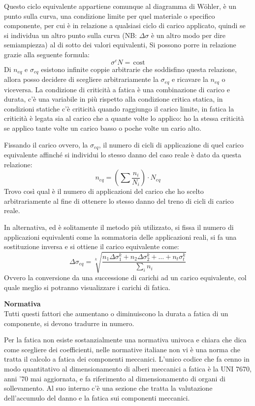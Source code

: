 \documentclass{article}
\begin{document}
\begin{adjustwidth}{2in}{}
				Questo ciclo equivalente appartiene comunque al diagramma di Wöhler, è un punto sulla curva, una condizione limite per quel materiale o specifico componente, per cui è in relazione a qualsiasi ciclo di carico applicato, quindi se si individua un altro punto sulla curva (NB: $\Delta\sigma$ è un altro modo per dire semiampiezza) al di sotto dei valori equivalenti, Si possono porre in relazione grazie alla seguente formula:
				\[\sigma^cN=\,\text{cost}\]				
				Di $n_{eq}$ e $\sigma_{eq}$ esistono infinite coppie arbitrarie che soddisfino questa relazione, allora posso decidere di scegliere arbitrariamente la $\sigma_{eq}$ e ricavare la $n_{eq}$ o viceversa. La condizione di criticità a fatica è una combinazione di carico e durata, c'è una variabile in più rispetto alla condizione critica statica, in condizioni statiche c'è criticità quando raggiungo il carico limite, in fatica la criticità è legata sia al carico che a quante volte lo applico: ho la stessa criticità se applico tante volte un carico basso o poche volte un cario alto.
				
				Fissando il carico ovvero, la $\sigma_{eq}$, il numero di cicli di applicazione di quel carico equivalente affinché si individui lo stesso danno del caso reale è dato da questa relazione:
				\[n_{eq} = \left(\sum \dfrac{n_i}{N_i}\right)\cdot N_{eq}\]
				Trovo così qual è il numero di applicazioni del carico che ho scelto arbitrariamente al fine di ottenere lo stesso danno del treno di cicli di carico reale. \newline 
				
				In alternativa, ed è solitamente il metodo più utilizzato, si fissa il numero di applicazioni equivalenti come la sommatoria delle applicazioni reali, si fa una sostituzione inversa e si ottiene il carico equivalente come:
				\[\Delta\sigma_{eq} = \sqrt[k]{\dfrac{n_1\Delta\sigma_1^k + n_2\Delta\sigma_2^k + \dots + n_t\sigma_t^k }{\sum_in_i}}\]		
				Ovvero la conversione da una successione di carichi ad un carico equivalente, col quale meglio si potranno visualizzare i carichi di fatica. \newline
				
				{\Large \textbf{Normativa}} \\								
				Tutti questi fattori che aumentano o diminuiscono la durata a fatica di un componente, si devono tradurre in numero. \newline
				
				Per la fatica non esiste sostanzialmente una normativa univoca e chiara che dica come scegliere dei coefficienti, nelle normative italiane non vi è una norma che tratta il calcolo a fatica dei componenti meccanici. L'unico codice che fa cenno in modo quantitativo al dimensionamento di alberi meccanici a fatica è la UNI 7670, anni '70 mai aggiornata, e fa riferimento al dimensionamento di organi di sollevamento. Al suo interno c'è una sezione che tratta la valutazione dell'accumulo del danno e la fatica sui componenti meccanici. 
				

\end{adjustwidth}
\end{document}
